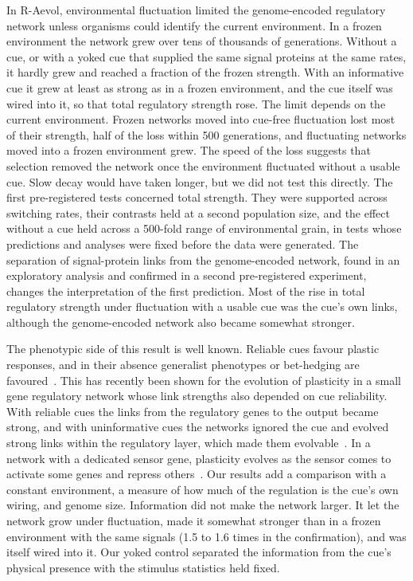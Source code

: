 \documentclass[10pt,letterpaper]{article}
\begin{document}
In R-Aevol, environmental fluctuation limited the genome-encoded regulatory
network unless organisms could identify the current environment. In a frozen environment the network grew over tens of thousands of
generations. Without a cue, or with a yoked cue that supplied the same signal
proteins at the same rates, it hardly grew and reached a fraction of the frozen
strength. With an informative cue it grew at least as strong as in a frozen
environment, and the cue itself was wired into it, so that total regulatory
strength rose. The limit depends on the current environment. Frozen networks
moved into cue-free fluctuation lost most of their strength, half of the loss
within 500 generations, and fluctuating networks moved into a frozen environment
grew. The speed of the loss suggests that selection removed the network once the
environment fluctuated without a usable cue. Slow decay would have taken longer,
but we did not test this directly. The first pre-registered tests concerned
total strength. They were supported across switching rates, their contrasts held
at a second population size, and the effect without a cue held across a
500-fold range of environmental grain, in tests whose predictions and analyses
were fixed before the data were generated. The separation of signal-protein links from the
genome-encoded network, found in an exploratory analysis and confirmed in a
second pre-registered experiment, changes the interpretation of the first
prediction. Most of the rise in total regulatory strength under fluctuation with
a usable cue was the cue's own links, although the genome-encoded network also
became somewhat stronger.

The phenotypic side of this result is well known. Reliable cues favour plastic
responses, and in their absence generalist phenotypes or bet-hedging are
favoured~\cite{levins1968,moran1992,kussell2005,botero2015}. This has recently
been shown for the evolution of plasticity in a small gene regulatory network
whose link strengths also depended on cue reliability. With reliable cues the
links from the regulatory genes to the output became strong, and with
uninformative cues the networks ignored the cue and evolved strong links within
the regulatory layer, which made them evolvable~\cite{jorritsma2026}. In a
network with a dedicated sensor gene, plasticity evolves as the sensor comes to
activate some genes and repress others~\cite{sakamoto2024}. Our results add a
comparison with a constant environment, a measure of how much of the regulation
is the cue's own wiring, and genome size. Information did not make the network
larger. It let the network grow under fluctuation, made it somewhat
stronger than in a frozen environment with the same signals (1.5 to 1.6 times in
the confirmation), and was itself wired into it. Our yoked
control separated the information from the cue's physical presence with the
stimulus statistics held fixed.
\end{document}

